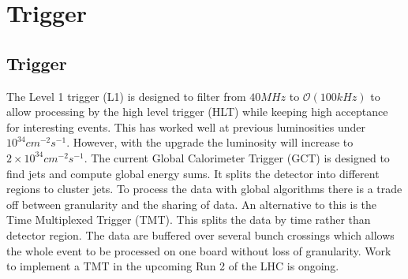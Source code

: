 
\chapter{Trigger} %

\label{Chapter4} %



\section{Trigger}
The Level 1 trigger (L1) is designed to filter from $40MHz$ to $\mathcal{O}(100kHz)$ to allow processing by the high level trigger (HLT) while keeping high acceptance for interesting events. This has worked well at previous luminosities under $10^{34} cm^{-2}s^{-1}$. However, with the upgrade the luminosity will increase to $2\times10^{34} cm^{-2}s^{-1}$. The current Global Calorimeter Trigger (GCT) is designed to find jets and compute global energy sums. It splits the detector into different regions to cluster jets\cite{gct}. To process the data with global algorithms there is a trade off between granularity and the sharing of data. An alternative to this is the Time Multiplexed Trigger (TMT)\cite{rose}. This splits the data by time rather than detector region. The data are buffered over several bunch crossings which allows the whole event to be processed on one board without loss of granularity. Work to implement a TMT in the upcoming Run 2 of the LHC is ongoing. 